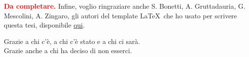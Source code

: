 \textbf{\textcolor{red}{Da completare.}}
Infine, voglio ringraziare anche S. Bonetti, A. Gruttadauria, G. Mescolini, A. Zingaro, gli autori del template \LaTeX \ che ho usato per scrivere questa tesi, disponibile \href{https://www.overleaf.com/latex/templates/classical-format-thesis-scuola-di-ingegneria-industriale-e-dellinformazione-politecnico-di-milano/dkmvtndqkyxg}{qui}.

Grazie a chi c'è, a chi c'è stato e a chi ci sarà.
\\
Grazie anche a chi ha deciso di non esserci.